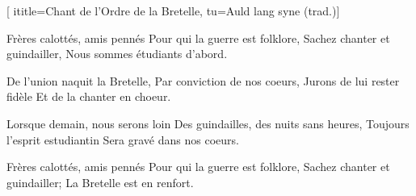  [
ititle={Chant de l'Ordre de la Bretelle},
tu={Auld lang syne (trad.)}]

\beginverse
Frères calottés, amis pennés
Pour qui la guerre est folklore,
Sachez chanter et guindailler,
Nous sommes étudiants d'abord.
\endverse

\beginverse
De l'union naquit la Bretelle,
Par conviction de nos coeurs,
Jurons de lui rester fidèle
Et de la chanter en choeur.
\endverse

\beginverse
Lorsque demain, nous serons loin
Des guindailles, des nuits sans heures,
Toujours l'esprit estudiantin
Sera gravé dans nos coeurs.
\endverse

\beginverse
Frères calottés, amis pennés
Pour qui la guerre est folklore,
Sachez chanter et guindailler;
La Bretelle est en renfort.
\endverse
\endsong